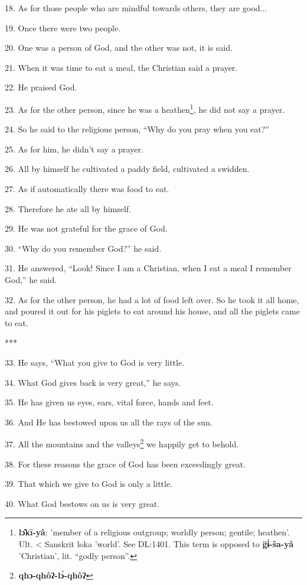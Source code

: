 18. As for those people who are mindful towards others, they are good...

19. Once there were two people.

20. One was a person of God, and the other was not, it is said.

21. When it was time to eat a meal, the Christian said a prayer.

22. He praised God.

23. As for the other person, since he was a heathen\footnote{\textbf{lɔ̂kī-yâ}: 'member of a religious outgroup; worldly person; gentile; heathen'. Ult. < Sanskrit loka 'world'. See DL:1401. This term is opposed to \textbf{g̈ɨ̀-ša-yâ} 'Christian', lit. ``godly person''.}, he did not say a prayer.

24. So he said to the religious person, ``Why do you pray when you eat?''

25. As for him, he didn't say a prayer.

26. All by himself he cultivated a paddy field, cultivated a swidden.

27. As if automatically there was food to eat.

28. Therefore he ate all by himself.

29. He was not grateful for the grace of God.

30. ``Why do you remember God?'' he said.

31. He answered, ``Look! Since I am a Christian, when I eat a meal I remember God,''
he said.

32. As for the other person, he had a lot of food left over. So he took it all
home, and poured it out for his piglets to eat around his house, and all the piglets
came to eat.

***

33. He says, ``What you give to God is very little.

34. What God gives back is very great,'' he says.

35. He has given us eyes, ears, vital force, hands and feet.

36. And He has bestowed upon us all the rays of the sun.

37. All the mountains and the valleys\footnote{\textbf{qhɔ-qhôʔ-lɔ̀-qhôʔ}} we happily get to behold.

38. For these reasons the grace of God has been exceedingly great.

39. That which we give to God is only a little.

40. What God bestows on us is very great.

